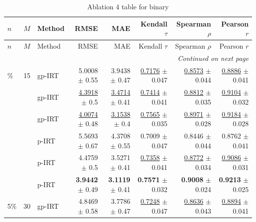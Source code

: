 \footnotesize
\setlength{\tabcolsep}{2pt}
\renewcommand{\arraystretch}{1.05}
\setlength{\LTpre}{0pt}
\setlength{\LTpost}{0pt}
\setlength{\LTleft}{\fill}
\setlength{\LTright}{\fill}
\begin{longtable}{llp{}rrrrr}
\caption{Ablation 4 table for binary}\label{tab:ablation\_4\_binary}\\
\toprule
$n$ & $M$ & Method & RMSE & MAE & Kendall $\tau$ & Spearman $\rho$ & Pearson $r$ \\
\midrule
\endfirsthead
\toprule
$n$ & $M$ & Method & RMSE & MAE & Kendall $\tau$ & Spearman $\rho$ & Pearson $r$ \\
\midrule
\endhead
\midrule
\multicolumn{8}{r}{\emph{Continued on next page}} \\
\midrule
\endfoot
\bottomrule
\endlastfoot
5\% & 15 & gp-IRT & 5.0008 {\scriptsize $\pm$ 0.55} & 3.9438 {\scriptsize $\pm$ 0.47} & \underline{0.7176} {\scriptsize $\pm$ 0.047} & \underline{0.8573} {\scriptsize $\pm$ 0.044} & \underline{0.8886} {\scriptsize $\pm$ 0.041} \\
 &  & gp-IRT & \underline{4.3918} {\scriptsize $\pm$ 0.5} & \underline{3.4714} {\scriptsize $\pm$ 0.41} & \underline{0.7414} {\scriptsize $\pm$ 0.041} & \underline{0.8812} {\scriptsize $\pm$ 0.035} & \underline{0.9104} {\scriptsize $\pm$ 0.032} \\
 &  & gp-IRT & \underline{4.0074} {\scriptsize $\pm$ 0.48} & \underline{3.1538} {\scriptsize $\pm$ 0.4} & \underline{0.7565} {\scriptsize $\pm$ 0.035} & \underline{0.8971} {\scriptsize $\pm$ 0.028} & \underline{0.9184} {\scriptsize $\pm$ 0.028} \\
 &  & p-IRT & 5.5693 {\scriptsize $\pm$ 0.67} & 4.3708 {\scriptsize $\pm$ 0.55} & 0.7009 {\scriptsize $\pm$ 0.047} & 0.8446 {\scriptsize $\pm$ 0.044} & 0.8762 {\scriptsize $\pm$ 0.041} \\
 &  & p-IRT & 4.4759 {\scriptsize $\pm$ 0.5} & 3.5271 {\scriptsize $\pm$ 0.41} & \underline{0.7358} {\scriptsize $\pm$ 0.041} & \underline{0.8772} {\scriptsize $\pm$ 0.034} & \underline{0.9086} {\scriptsize $\pm$ 0.031} \\
 &  & p-IRT & \textbf{3.9442} {\scriptsize $\pm$ 0.49} & \textbf{3.1119} {\scriptsize $\pm$ 0.41} & \textbf{0.7571} {\scriptsize $\pm$ 0.032} & \textbf{0.9008} {\scriptsize $\pm$ 0.024} & \textbf{0.9213} {\scriptsize $\pm$ 0.025} \\
\midrule
5\% & 30 & gp-IRT & 4.8469 {\scriptsize $\pm$ 0.58} & 3.7786 {\scriptsize $\pm$ 0.47} & \underline{0.7248} {\scriptsize $\pm$ 0.047} & \underline{0.8636} {\scriptsize $\pm$ 0.043} & \underline{0.8894} {\scriptsize $\pm$ 0.041} \\

\end{longtable}

